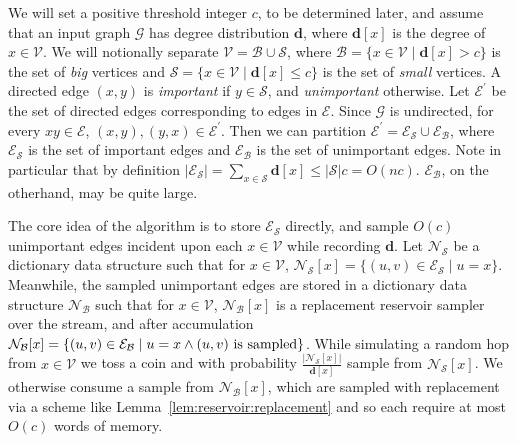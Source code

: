 \documentclass{report}
\begin{document}

We will set a positive threshold integer $c$, to be determined later, and assume that an input graph $\mathcal{G}$ has degree distribution $\mathbf{d}$, where $\mathbf{d}[x]$ is the degree of $x \in \mathcal{V}$. 
We will notionally separate $\mathcal{V} = \mathcal{B} \cup \mathcal{S}$, where $\mathcal{B} = \{x \in \mathcal{V} \mid \mathbf{d}[x] > c \}$ is the set of \emph{big} vertices and $\mathcal{S} = \{x \in \mathcal{V} \mid \mathbf{d}[x] \leq c\}$ is the set of \emph{small} vertices.
A directed edge $(x, y)$ is \emph{important} if $y \in \mathcal{S}$, and \emph{unimportant} otherwise.
Let $\mathcal{E}^\prime$ be the set of directed edges corresponding to edges in $\mathcal{E}$. 
Since $\mathcal{G}$ is undirected, for every $xy \in \mathcal{E}$, $(x, y), (y, x) \in \mathcal{E}^\prime$.
Then we can partition $\mathcal{E}^\prime = \mathcal{E}_\mathcal{S} \cup \mathcal{E}_\mathcal{B}$, where $\mathcal{E}_\mathcal{S}$ is the set of important edges and $\mathcal{E}_\mathcal{B}$ is the set of unimportant edges. 
Note in particular that by definition $|\mathcal{E}_\mathcal{S}| = \sum_{x \in \mathcal{S}} \mathbf{d}[x] \leq |\mathcal{S}|c = O(nc)$.
$\mathcal{E}_\mathcal{B}$, on the otherhand, may be quite large.

The core idea of the algorithm is to store $\mathcal{E}_\mathcal{S}$ directly, and sample $O(c)$ unimportant edges incident upon each $x \in \mathcal{V}$ while recording $\mathbf{d}$.
Let $\mathcal{N}_\mathcal{S}$ be a dictionary data structure such that for $x \in \mathcal{V}$, $\mathcal{N}_\mathcal{S}[x] = \{(u, v) \in \mathcal{E}_\mathcal{S} \mid u = x \}$.
Meanwhile, the sampled unimportant edges are stored in a dictionary data structure $\mathcal{N}_\mathcal{B}$ such that for $x \in \mathcal{V}$, $\mathcal{N}_\mathcal{B}[x]$ is a replacement reservoir sampler over the stream, and after accumulation  $\mathcal{N}_\mathcal{B}[x]= \{(u, v) \in \mathcal{E}_\mathcal{B} \mid u = x \wedge \textnormal{$(u, v)$ is sampled} \}$.
While simulating a random hop from $x \in \mathcal{V}$ we toss a coin and with probability $\frac{|\mathcal{N}_\mathcal{S}[x]|}{\mathbf{d}[x]}$ sample from $\mathcal{N}_\mathcal{S}[x]$.
We otherwise consume a sample from $\mathcal{N}_\mathcal{B}[x]$, which are sampled with replacement via a scheme like Lemma~\ref{lem:reservoir:replacement} and so each require at most $O(c)$ words of memory.
\end{document}
